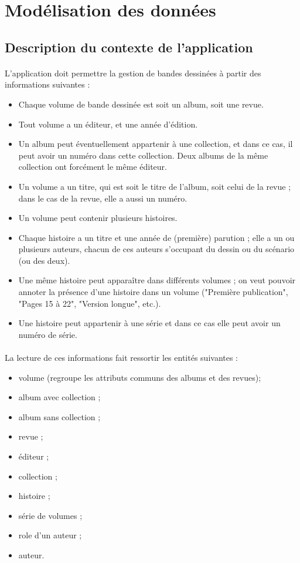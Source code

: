 \documentclass[12pt]{article}
\begin{document}
\section{Modélisation des données}

\subsection{Description du contexte de l'application}

\paragraph{}
L'application doit permettre la gestion de bandes dessinées à partir des
informations suivantes :

\begin{itemize}
	\item Chaque volume de bande dessinée est soit un album, soit une revue.
	\item Tout volume a un éditeur, et une année d’édition.
	\item Un album peut éventuellement appartenir à une collection, et dans ce cas, il
		peut avoir un numéro dans cette collection. Deux albums de la même collection
		ont forcément le même éditeur.
	\item Un volume a un titre, qui est soit le titre de l'album, soit celui de la
		revue ; dans le cas de la revue, elle a aussi un numéro.
	\item Un volume peut contenir plusieurs histoires.
	\item Chaque histoire a un titre et une année de (première) parution ; elle a un
		ou plusieurs auteurs, chacun de ces auteurs s’occupant du dessin ou du
		scénario (ou des deux).
	\item Une même histoire peut apparaître dans différents volumes ; on veut pouvoir
		annoter la présence d’une histoire dans un volume ("Première publication",
		"Pages 15 à 22", "Version longue", etc.).
	\item Une histoire peut appartenir à une série et dans ce cas elle peut avoir un
		numéro de série.
\end{itemize}

\paragraph{}
La lecture de ces informations fait ressortir les entités suivantes :
\begin{itemize}
	\item volume (regroupe les attributs communs des albums et des revues);
	\item album avec collection ;
	\item album sans collection ;
	\item revue ;
	\item éditeur ;
	\item collection ;
	\item histoire ;
	\item série de volumes ;
	\item role d'un auteur ;
	\item auteur.
\end{itemize}
\end{document}
